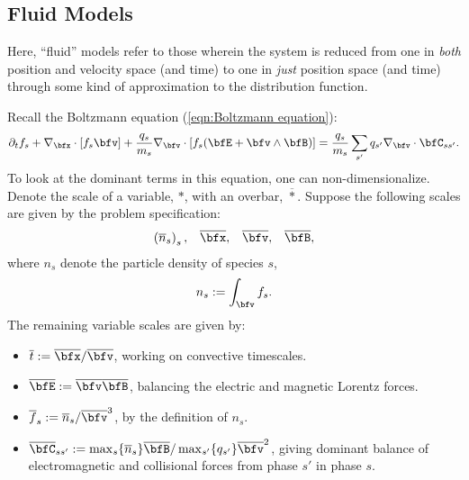 \subsection*{Fluid Models}
    \line

    \begin{definition}
        Here, ``fluid'' models refer to those wherein the system is reduced from one in \emph{both} position and velocity space (and time) to one in \emph{just} position space (and time) through some kind of approximation to the distribution function.
    \end{definition}

    \line
    
    Recall the Boltzmann equation (\ref{eqn:Boltzmann equation}):
    \begin{equation*}
        \partial_{t}f_{s} + \nabla_{\bfx}\cdot[f_{s}\bfv] + \frac{q_{s}}{m_{s}}\nabla_{\bfv}\cdot[f_{s}(\bfE + \bfv\wedge\bfB)]  =  \frac{q_{s}}{m_{s}}\sum_{s'}q_{s'}\nabla_{\bfv}\cdot\bfC_{ss'}.
    \end{equation*}
    To look at the dominant terms in this equation, one can non-dimensionalize. Denote the scale of a variable, $*$, with an overbar, $\overline{*}$. Suppose the following scales are given by the problem specification:
    \begin{align}
        \left(\overline{n}_{s}\right)_{s},         &&
        \overline{\bfx},                           &&
        \overline{\bfv},                           &&
        \overline{\bfB},
    \end{align}
    where $n_{s}$ denote the particle density of species $s$,
    \begin{equation}
        n_{s}  :=  \int_{\bfv}f_{s}.
    \end{equation}
    The remaining variable scales are given by:
    \begin{itemize}
        \item  $\overline{t}           :=  \overline{\bfx}/\overline{\bfv}$, working on convective timescales.
        \item  $\overline{\bfE}        :=  \overline{\bfv}\overline{\bfB}$, balancing the electric and magnetic Lorentz forces. 
        \item  $\overline{f}_{s}       :=  \overline{n}_{s}/\overline{\bfv}^{3}$, by the definition of $n_{s}$.
        \item  $\overline{\bfC}_{ss'}  :=  \max_{s}\{\overline{n}_{s}\}\overline{\bfB}/\max_{s'}\{q_{s'}\}\overline{\bfv}^{2}$, giving dominant balance of electromagnetic and collisional forces from phase $s'$ in phase $s$. 
    \end{itemize}
    
